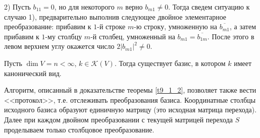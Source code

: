 2) Пусть $b_{11}=0$, но для некоторого $m$ верно $b_{m1}\neq 0$. Тогда сведем ситуацию к случаю 1), предварительно выполнив следующее двойное элементарное преобразование:
прибавим к $1$-й строке $m$-ю строку, умноженную на $\overline{b_{m1}}$, а затем прибавим к $1$-му столбцу $m$-й столбец, умноженный на $b_{m1} = \overline{b_{1m}}$.
После этого в левом верхнем углу окажется число $2|b_{m1}|^2\neq 0$.
\edok

\begin{sled}
Пусть $\dim V=n<\infty$,  $k \in \mathcal{K} (V)$. Тогда существует базис, в котором $k$ имеет канонический вид.
\end{sled}

Алгоритм, описанный в доказательстве теоремы \ref{t9_1_2}, позволяет также вести <<протокол>>, т.е. отслеживать преобразования базиса.
Координатные столбцы исходного базиса образуют единичную матрицу (это исходная матрица перехода). Далее при каждом двойном преобразовании с текущей матрицей перехода
$S$ проделываем только столбцовое преобразование.
